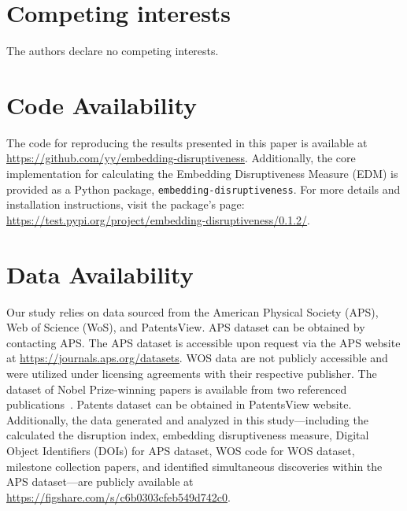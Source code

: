 \documentclass[12pt]{article}
\begin{document}
\section*{Competing interests}
The authors declare no competing interests.

\section*{Code Availability}
\sloppy
The code for reproducing the results presented in this paper is available at \url{https://github.com/yy/embedding-disruptiveness}. Additionally, the core implementation for calculating the Embedding Disruptiveness Measure (EDM) is provided as a Python package, \texttt{embedding-disruptiveness}. For more details and installation instructions, visit the package's page: \url{https://test.pypi.org/project/embedding-disruptiveness/0.1.2/}.


\section*{Data Availability}
Our study relies on data sourced from the American Physical Society (APS), Web of Science (WoS), and PatentsView. APS dataset can be obtained by contacting APS. The APS dataset is accessible upon request via the APS website at \url{https://journals.aps.org/datasets}. WOS data are not publicly accessible and were utilized under licensing agreements with their respective publisher. The dataset of Nobel Prize-winning papers is available from two referenced publications~\cite{DVN/6NJ5RN_2018,ioannidis2020work}. Patents dataset can be obtained in PatentsView website. Additionally, the data generated and analyzed in this study---including the calculated the disruption index, embedding disruptiveness measure, Digital Object Identifiers (DOIs) for APS dataset, WOS code for WOS dataset, milestone collection papers, and identified simultaneous discoveries within the APS dataset---are publicly available at \url{https://figshare.com/s/c6b0303cfeb549d742c0}.



\fussy
\end{document}
